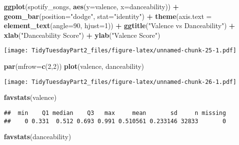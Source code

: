\documentclass[
]{article}
\newenvironment{Shaded}{\begin{snugshade}}{\end{snugshade}}
\newcommand{\DataTypeTok}[1]{\textcolor[rgb]{0.13,0.29,0.53}{#1}}
\newcommand{\DecValTok}[1]{\textcolor[rgb]{0.00,0.00,0.81}{#1}}
\newcommand{\KeywordTok}[1]{\textcolor[rgb]{0.13,0.29,0.53}{\textbf{#1}}}
\newcommand{\NormalTok}[1]{#1}
\newcommand{\OperatorTok}[1]{\textcolor[rgb]{0.81,0.36,0.00}{\textbf{#1}}}
\newcommand{\StringTok}[1]{\textcolor[rgb]{0.31,0.60,0.02}{#1}}
\begin{document}
\begin{Shaded}
\begin{Highlighting}[]
\KeywordTok{ggplot}\NormalTok{(spotify_songs, }\KeywordTok{aes}\NormalTok{(}\DataTypeTok{y=}\NormalTok{valence, }\DataTypeTok{x=}\NormalTok{danceability)) }\OperatorTok{+}\StringTok{ }
\StringTok{  }\KeywordTok{geom_bar}\NormalTok{(}\DataTypeTok{position=}\StringTok{"dodge"}\NormalTok{, }\DataTypeTok{stat=}\StringTok{"identity"}\NormalTok{) }\OperatorTok{+}\StringTok{ }
\StringTok{  }\KeywordTok{theme}\NormalTok{(}\DataTypeTok{axis.text =} \KeywordTok{element_text}\NormalTok{(}\DataTypeTok{angle=}\DecValTok{90}\NormalTok{, }\DataTypeTok{hjust=}\DecValTok{1}\NormalTok{)) }\OperatorTok{+}\StringTok{ }
\StringTok{  }\KeywordTok{ggtitle}\NormalTok{(}\StringTok{"Valence vs Danceability"}\NormalTok{) }\OperatorTok{+}\StringTok{ }\KeywordTok{xlab}\NormalTok{(}\StringTok{"Danceability Score"}\NormalTok{) }\OperatorTok{+}\StringTok{ }
\StringTok{  }\KeywordTok{ylab}\NormalTok{(}\StringTok{"Valence Score"}\NormalTok{)}
\end{Highlighting}
\end{Shaded}

\texttt{[image: TidyTuesdayPart2\_files/figure-latex/unnamed-chunk-25-1.pdf]}

\begin{Shaded}
\begin{Highlighting}[]
\KeywordTok{par}\NormalTok{(}\DataTypeTok{mfrow=}\KeywordTok{c}\NormalTok{(}\DecValTok{2}\NormalTok{,}\DecValTok{2}\NormalTok{))}
\KeywordTok{plot}\NormalTok{(valence, danceability)}
\end{Highlighting}
\end{Shaded}

\texttt{[image: TidyTuesdayPart2\_files/figure-latex/unnamed-chunk-26-1.pdf]}

\begin{Shaded}
\begin{Highlighting}[]
\KeywordTok{favstats}\NormalTok{(valence)}
\end{Highlighting}
\end{Shaded}

\begin{verbatim}
##  min    Q1 median    Q3   max     mean       sd     n missing
##    0 0.331  0.512 0.693 0.991 0.510561 0.233146 32833       0
\end{verbatim}

\begin{Shaded}
\begin{Highlighting}[]
\KeywordTok{favstats}\NormalTok{(danceability)}
\end{Highlighting}
\end{Shaded}
\end{document}
